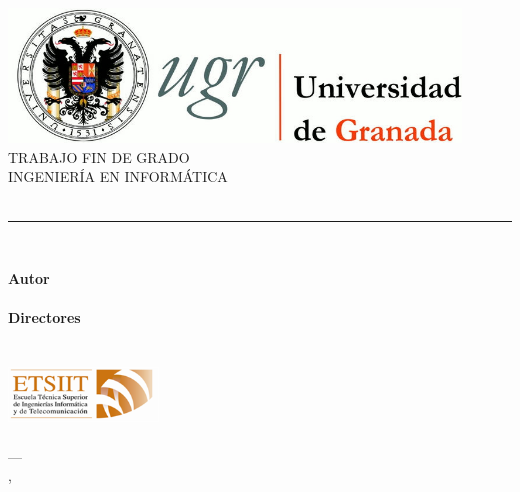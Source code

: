 \begin{titlepage}
 
 
\newlength{\centeroffset}
\setlength{\centeroffset}{-0.5\oddsidemargin}
\addtolength{\centeroffset}{0.5\evensidemargin}
\thispagestyle{empty}

\noindent\hspace*{\centeroffset}\begin{minipage}{\textwidth}

\centering
\includegraphics[width=0.9\textwidth]{imagenes/logo_ugr.jpg}\\[1.4cm]

\textsc{ \Large TRABAJO FIN DE GRADO\\[0.2cm]}
\textsc{ INGENIERÍA EN INFORMÁTICA }\\[1cm]
% 
{\Huge\bfseries \myTitle\\
}
\noindent\rule[-1ex]{\textwidth}{3pt}\\[3.5ex]
{\large\bfseries \mySubtitle}
\end{minipage}

\vspace{2.0cm}
\noindent\hspace*{\centeroffset}\begin{minipage}{\textwidth}
\centering

\textbf{Autor}\\ {\myName}\\[2.5ex]
\textbf{Directores}\\
{\myProf\\
\myOtherProf}\\[2cm]
\includegraphics[width=0.3\textwidth]{imagenes/etsiit_logo.png}\\[0.1cm]
\textsc{\myFaculty}\\
\textsc{---}\\
\myLocation, \myTime 
\end{minipage}
\end{titlepage}


